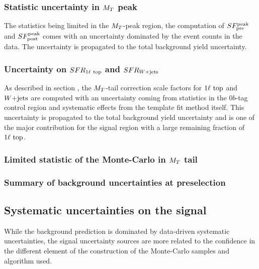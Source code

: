             \subsubsection{Statistic uncertainty in $M_T$ peak}
            
            The statistics being limited in the $M_T$-peak region, the computation of 
            $SF_{\text{pre}}^{\text{peak}}$ and $SF_{\text{post}}^{\text{peak}}$ comes with an uncertainty dominated by the event counts 
            in the data. The uncertainty is propagated to the total background yield uncertainty.

            \subsubsection{Uncertainty on $SFR_{1\ell~\text{top}}$ and $SFR_{\text{$W$+jets}}$}

            As described in section \label{sec:MTtailCorrection}, the $M_T$-tail correction
            scale factors for $1\ell~\text{top}$ and $\text{$W$+jets}$ are computed with an uncertainty
            coming from statistics in the $0b$-tag control region and systematic effects
            from the template fit method itself. This uncertainty is propagated to the total
            background yield uncertainty and is one of the major contribution for the signal
            region with a large remaining fraction of $1\ell~\text{top}$.

            \subsubsection{Limited statistic of the Monte-Carlo in $M_T$ tail}
            
            \todo{}

            \subsubsection{Summary of background uncertainties at preselection}
           
            \todo{}

        \subsection{Systematic uncertainties on the signal}

        While the background prediction is dominated by data-driven systematic
        uncertainties, the signal uncertainty sources are more related to the
        confidence in the different element of the construction of the Monte-Carlo
        samples and algorithm used.

